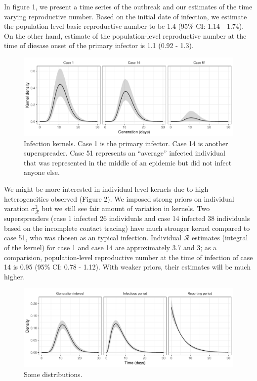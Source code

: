 \documentclass[12pt]{article}
\begin{document}
In figure 1, we present a time series of the outbreak and our estimates of the time varying reproductive number.  
Based on the initial date of infection, we estimate the population-level basic reproductive number to be 1.4 (95\% CI: 1.14 - 1.74).
On the other hand, estimate of the population-level reproductive number at the time of diesase onset of the primary infector is 1.1 (0.92 - 1.3).

\begin{figure}
\includegraphics[width=\textwidth]{../figure/kernel.pdf}
\caption{Infection kernels. Case 1 is the primary infector. Case 14 is another superspreader. Case 51 represents an ``average'' infected individual that was represented in the middle of an epidemic but did not infect anyone else.}
\end{figure}

We might be more interested in individual-level kernels due to high heterogeneities observed (Figure 2).
We imposed strong priors on individual varation $\sigma_{\mathcal R}^2$ but we still see fair amount of variation in kernels. Two superspreaders (case 1 infected 26 individuals and case 14 infected 38 individuals based on the incomplete contact tracing) have much stronger kernel compared to case 51, who was chosen as an typical infection.
Individual $\mathcal R$ estimates (integral of the kernel) for case 1 and case 14 are approximately 3.7 and 3; as a comparision, population-level reproductive number at the time of infection of case 14 is 0.95 (95\% CI: 0.78 - 1.12).
With weaker priors, their estimates will be much higher.

\begin{figure}
\includegraphics[width=\textwidth]{../figure/distribution.pdf}
\caption{Some distributions.}
\end{figure}
\end{document}

